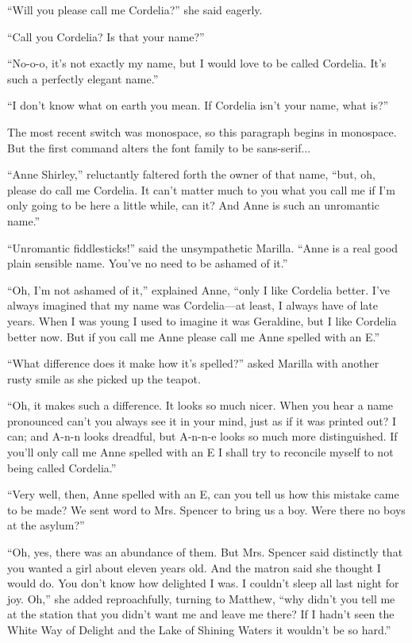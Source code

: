 \documentclass[a4paper]{article}
\begin{document}
``Will you please call me Cordelia?'' she said eagerly.

``Call you Cordelia? Is that your name?''

``No-o-o, it's not exactly my name, but I would love to be called Cordelia. It's such a perfectly elegant name.''

``I don't know what on earth you mean. If Cordelia isn't your name, what is?''

The most recent switch was monospace, so this paragraph begins in monospace. But the first command alters the font family to be sans-serif...


``Anne Shirley,'' reluctantly faltered forth the owner of that name, ``but, oh, please do call me Cordelia. It can't matter much to you what you call me if I'm only going to be here a little while, can it? And Anne is such an unromantic name.''

``Unromantic fiddlesticks!'' said the unsympathetic Marilla. ``Anne is a real good plain sensible name. You've no need to be ashamed of it.''

``Oh, I'm not ashamed of it,'' explained Anne, ``only I like Cordelia better. I've always imagined that my name was Cordelia---at least, I always have of late years. When I was young I used to imagine it was Geraldine, but I like Cordelia better now. But if you call me Anne please call me Anne spelled with an E.''

``What difference does it make how it's spelled?'' asked Marilla with another rusty smile as she picked up the teapot.

``Oh, it makes such a difference. It looks so much nicer. When you hear a name pronounced can't you always see it in your mind, just as if it was printed out? I can; and A-n-n looks dreadful, but A-n-n-e looks so much more distinguished. If you'll only call me Anne spelled with an E I shall try to reconcile myself to not being called Cordelia.''

``Very well, then, Anne spelled with an E, can you tell us how this mistake came to be made? We sent word to Mrs. Spencer to bring us a boy. Were there no boys at the asylum?''

``Oh, yes, there was an abundance of them. But Mrs. Spencer said distinctly that you wanted a girl about eleven years old. And the matron said she thought I would do. You don't know how delighted I was. I couldn't sleep all last night for joy. Oh,'' she added reproachfully, turning to Matthew, ``why didn't you tell me at the station that you didn't want me and leave me there? If I hadn't seen the White Way of Delight and the Lake of Shining Waters it wouldn't be so hard.''
\end{document}
